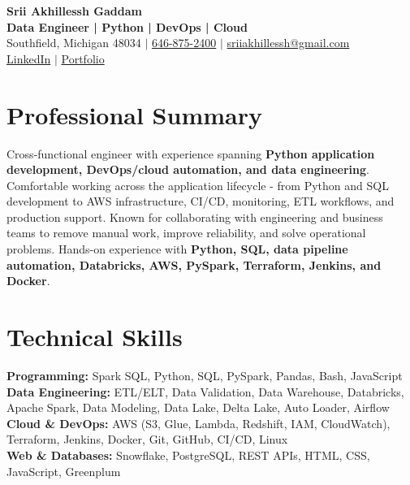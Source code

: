 \documentclass[letterpaper,10pt]{article}
\begin{document}
\fontsize{9.35pt}{10.45pt}\selectfont

\begin{center}
    {\LARGE \textbf{Srii Akhillessh Gaddam}} \\[-1pt]
    \textbf{Data Engineer | Python | DevOps | Cloud} \\[2pt]
    Southfield, Michigan 48034 $|$
    \href{tel:6468752400}{646-875-2400} $|$
    \href{mailto:sriiakhillessh@gmail.com}{sriiakhillessh@gmail.com} \\[1pt]
    \href{https://www.linkedin.com/in/srii-akhiilessh-gaddam-b48668191/}{LinkedIn} $|$
    \href{https://sriiakhillesshg.github.io/portfolio/}{Portfolio}
\end{center}
\vspace{-8pt}

\section{Professional Summary}
\small{Cross-functional engineer with experience spanning \textbf{Python application development, DevOps/cloud automation, and data engineering}. Comfortable working across the application lifecycle - from Python and SQL development to AWS infrastructure, CI/CD, monitoring, ETL workflows, and production support. Known for collaborating with engineering and business teams to remove manual work, improve reliability, and solve operational problems. Hands-on experience with \textbf{Python, SQL, data pipeline automation, Databricks, AWS, PySpark, Terraform, Jenkins, and Docker}.}

\section{Technical Skills}
\small{
\textbf{Programming:} Spark SQL, Python, SQL, PySpark, Pandas, Bash, JavaScript \\
\textbf{Data Engineering:} ETL/ELT, Data Validation, Data Warehouse, Databricks, Apache Spark, Data Modeling, Data Lake, Delta Lake, Auto Loader, Airflow \\
\textbf{Cloud \& DevOps:} AWS (S3, Glue, Lambda, Redshift, IAM, CloudWatch), Terraform, Jenkins, Docker, Git, GitHub, CI/CD, Linux \\
\textbf{Web \& Databases:} Snowflake, PostgreSQL, REST APIs, HTML, CSS, JavaScript, Greenplum
}
\end{document}
